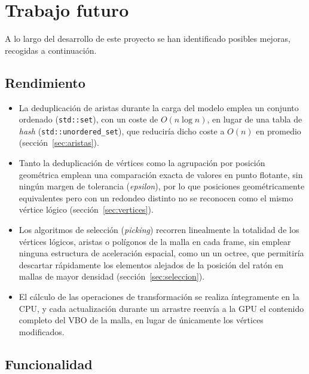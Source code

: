 \section{Trabajo futuro}

A lo largo del desarrollo de este proyecto se han identificado posibles mejoras, recogidas a continuación.

\subsection{Rendimiento}

\begin{itemize}
    \item La deduplicación de aristas durante la carga del modelo emplea un conjunto ordenado (\texttt{std::set}), con un coste de $O(n \log n)$, en lugar de una tabla de \emph{hash} (\texttt{std::unordered\_set}), que reduciría dicho coste a $O(n)$ en promedio (sección~\ref{sec:aristas}).
    \item Tanto la deduplicación de vértices como la agrupación por posición geométrica emplean una comparación exacta de valores en punto flotante, sin ningún margen de tolerancia (\emph{epsilon}), por lo que posiciones geométricamente equivalentes pero con un redondeo distinto no se reconocen como el mismo vértice lógico (sección~\ref{sec:vertices}).
    \item Los algoritmos de selección (\emph{picking}) recorren linealmente la totalidad de los vértices lógicos, aristas o polígonos de la malla en cada frame, sin emplear ninguna estructura de aceleración espacial, como un un octree, que permitiría descartar rápidamente los elementos alejados de la posición del ratón en mallas de mayor densidad (sección~\ref{sec:seleccion}).
    \item El cálculo de las operaciones de transformación se realiza íntegramente en la CPU, y cada actualización durante un arrastre reenvía a la GPU el contenido completo del VBO de la malla, en lugar de únicamente los vértices modificados.
\end{itemize}

\subsection{Funcionalidad}

